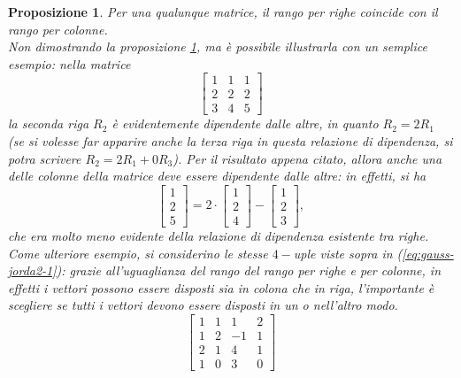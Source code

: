 \documentclass{book}
\theoremstyle{definition}
\theoremstyle{plain}
\newtheorem{prop}{Proposizione}[section]
\begin{document}
\begin{prop}
  \label{prop:gauss-jorda2}
  Per una qualunque matrice, il rango per righe coincide con il
  rango per colonne.\\
  Non dimostrando la proposizione \ref{prop:gauss-jorda2}, ma è possibile
  illustrarla con un semplice esempio: nella matrice
  \begin{equation*}
    \begin{bmatrix}
      1 & 1 & 1\\
      2 & 2 & 2\\
      3 & 4 & 5
    \end{bmatrix}
  \end{equation*}
  la seconda riga $R_2$ è evidentemente dipendente dalle altre, in quanto
  $R_2=2R_1$ (se si volesse far apparire anche la terza riga in questa
  relazione di dipendenza, si potra scrivere $R_2=2R_1+0R_3$).
  Per il risultato appena citato, allora anche una delle colonne della
  matrice deve essere dipendente dalle altre: in effetti, si ha
  \begin{equation*}
    \begin{bmatrix}
      1 \\
      2\\
      5
    \end{bmatrix}=2 \cdot
    \begin{bmatrix}
      1 \\
      2\\
      4
    \end{bmatrix}-
    \begin{bmatrix}
      1\\
      2\\
      3
    \end{bmatrix},
  \end{equation*}
  che era molto meno evidente della relazione di dipendenza esistente tra
  righe. Come ulteriore esempio, si considerino le stesse $4-$uple viste
  sopra in (\ref{eq:gauss-jorda2-1}): grazie all'uguaglianza del rango
  del rango per righe e per colonne, in effetti i vettori possono essere
  disposti sia in colona che in riga, l'importante è scegliere se tutti
  i vettori devono essere disposti in un o nell'altro modo.
  \begin{equation*}
    \begin{bmatrix}
      1 & 1 & 1 & 2\\
      1 & 2 & -1 & 1 \\
      2 & 1 & 4 & 1 \\
      1 & 0 & 3 & 0
    \end{bmatrix}
  \end{equation*}
\end{prop}
\end{document}
